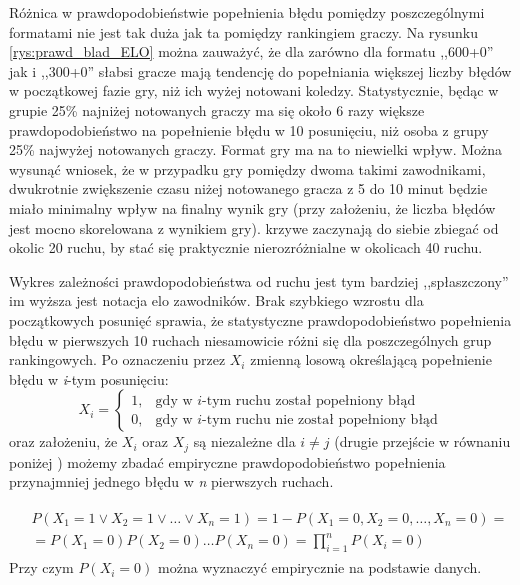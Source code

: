 \documentclass[inzynierska]{pwr_wmat_praca_dyplomowa}
\theoremstyle{plain}
\numberwithin{theorem}{chapter}
\theoremstyle{definition}
\numberwithin{theorem}{chapter}
\begin{document}
Różnica w prawdopodobieństwie popełnienia błędu pomiędzy poszczególnymi formatami nie jest tak duża jak ta pomiędzy rankingiem graczy. Na rysunku \ref{rys:prawd_blad_ELO} można zauważyć, że dla zarówno dla formatu ,,600+0'' jak i ,,300+0'' słabsi gracze mają tendencję do popełniania większej liczby błędów w początkowej fazie gry, niż ich wyżej notowani koledzy. Statystycznie, będąc w grupie 25\% najniżej notowanych graczy ma się około 6 razy większe prawdopodobieństwo na popełnienie błędu w 10 posunięciu, niż osoba z grupy 25\% najwyżej notowanych graczy. Format gry ma na to niewielki wpływ. Można wysunąć wniosek, że w przypadku gry pomiędzy dwoma takimi zawodnikami, dwukrotnie zwiększenie czasu niżej notowanego gracza z 5 do 10 minut będzie miało minimalny wpływ na finalny wynik gry (przy założeniu, że liczba błędów jest mocno skorelowana z wynikiem gry). krzywe zaczynają do siebie zbiegać od okolic 20 ruchu, by stać się praktycznie nierozróżnialne w okolicach 40 ruchu.

Wykres zależności prawdopodobieństwa od ruchu jest tym bardziej ,,spłaszczony'' im wyższa jest notacja elo zawodników. Brak szybkiego wzrostu dla początkowych posunięć sprawia, że statystyczne prawdopodobieństwo popełnienia błędu w pierwszych 10 ruchach niesamowicie różni się dla poszczególnych grup rankingowych.  Po oznaczeniu przez $X_i$ zmienną losową określającą popełnienie błędu w \textit{i}-tym posunięciu:
\begin{equation*}
X_i =
\begin{cases}
	1, & \text{gdy w $i$-tym ruchu został popełniony błąd}\\
	0, & \text{gdy w $i$-tym ruchu nie został popełniony błąd}
\end{cases}       
\end{equation*}
oraz założeniu, że $X_i$ oraz $X_j$ są niezależne dla $i \neq j$ (drugie przejście w równaniu poniżej \cite[str. 43]{prawdopodobienstwo_wstep}) możemy zbadać empiryczne prawdopodobieństwo popełnienia przynajmniej jednego błędu w \textit{n} pierwszych ruchach.

\begin{multline}
	\begin{split}
	& P(X_1 = 1 \vee X_2 = 1 \vee \dots \vee X_n = 1)  = 1 - P(X_1 = 0, X_2 = 0,\dots, X_n = 0) = \\
	& = P(X_1 = 0)P(X_2 = 0)\dots P(X_n = 0) = \prod_{i=1}^{n}P(X_i=0)
	\end{split}
\end{multline}
Przy czym $P(X_i=0)$ można wyznaczyć empirycznie na podstawie danych.\\
\end{document}
